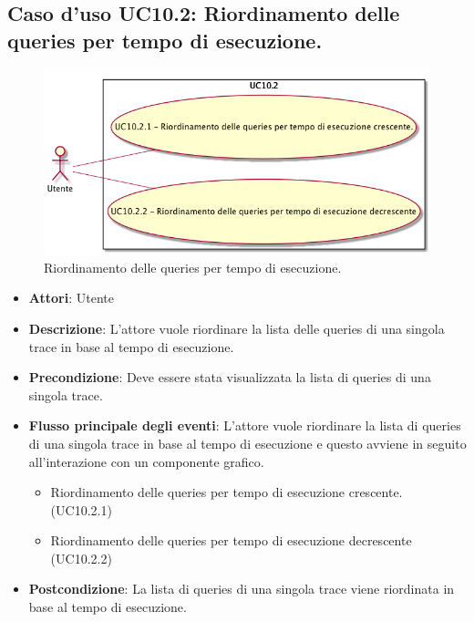 \subsection{Caso d'uso UC10.2: Riordinamento delle queries per tempo di esecuzione.}
\begin{figure} [H]
\centering
\includegraphics[scale=0.45]{./UC/UC10-2.png}
\caption{Riordinamento delle queries per tempo di esecuzione.}\label{}
\end{figure}
\begin{itemize}
\item \textbf{Attori}: Utente
\item \textbf{Descrizione}: L'attore vuole riordinare la lista delle queries di una singola trace in base al tempo di esecuzione.
\item \textbf{Precondizione}: Deve essere stata visualizzata la lista di queries di una singola trace.
\item \textbf{Flusso principale degli eventi}: L'attore vuole riordinare la lista di queries di una singola trace in base al tempo di esecuzione e questo avviene in seguito all'interazione con un componente grafico.
\begin{itemize}
\item Riordinamento delle queries per tempo di esecuzione crescente. (UC10.2.1)
\item Riordinamento delle queries per tempo di esecuzione decrescente (UC10.2.2)
\end{itemize}
\item \textbf{Postcondizione}: La lista di queries di una singola trace viene riordinata in base al tempo di esecuzione.
\end{itemize}
